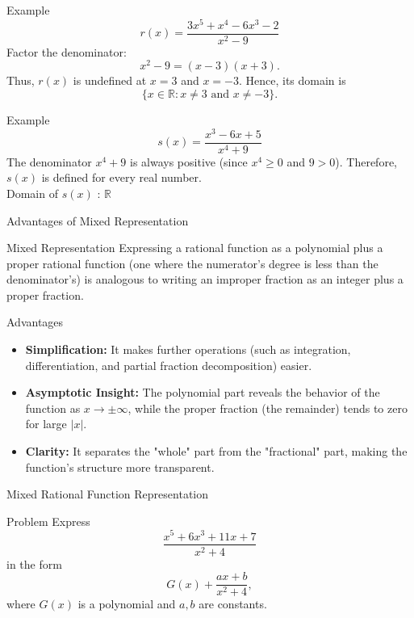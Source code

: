 \documentclass{beamer}
\begin{document}
\begin{frame}
  \begin{exampleblock}{Example }
    \[r(x)=\frac{3x^5+x^4-6x^3-2}{x^2-9}\]
    Factor the denominator:
    \[
      x^2-9=(x-3)(x+3).
    \]
    Thus, \(r(x)\) is undefined at \(x=3\) and \(x=-3\). Hence, its domain is
    \[
      \{x\in\mathbb{R}: x\neq 3 \text{ and } x\neq -3\}.
    \]
  \end{exampleblock}
\end{frame}

\begin{frame}{}
  \begin{exampleblock}{Example}
    \[s(x)=\frac{x^3-6x+5}{x^4+9}\]
    The denominator \(x^4+9\) is always positive (since \(x^4\ge 0\) and \(9>0\)). Therefore, \(s(x)\) is defined for every real number. \\
    Domain of \(s(x)\) :
    \(
      \mathbb{R}
    \)
  \end{exampleblock}
\end{frame}

\begin{frame}{Advantages of Mixed Representation}
  \begin{block}{Mixed Representation}
    Expressing a rational function as a polynomial plus a proper rational function (one where the numerator's degree is less than the denominator's) is analogous to writing an improper fraction as an integer plus a proper fraction.
  \end{block}
  \vspace{0.5em}
  \begin{block}{Advantages}
    \begin{itemize}
      \item \textbf{Simplification:} It makes further operations (such as integration, differentiation, and partial fraction decomposition) easier.
      \item \textbf{Asymptotic Insight:} The polynomial part reveals the behavior of the function as \(x\to\pm\infty\), while the proper fraction (the remainder) tends to zero for large \(|x|\).
      \item \textbf{Clarity:} It separates the "whole" part from the "fractional" part, making the function's structure more transparent.
    \end{itemize}
  \end{block}
\end{frame}

\begin{frame}{Mixed Rational Function Representation}
  \begin{exampleblock}{Problem}
    Express
    \[
      \frac{x^5 + 6x^3 + 11x + 7}{x^2+4}
    \]
    in the form
    \[
      G(x) + \frac{ax+b}{x^2+4},
    \]
    where \(G(x)\) is a polynomial and \(a, b\) are constants.
  \end{exampleblock}
\end{frame}
\end{document}
